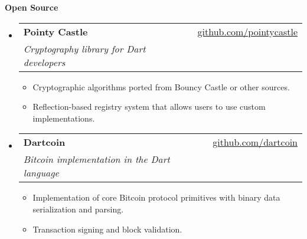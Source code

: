 \documentclass[letterpaper,11pt]{article}
\makeatletter
\newcommand{\resheading}[1]{{\large \colorbox{mygrey}{\begin{minipage}{\textwidth}{\textbf{#1 \vphantom{p\^{E}}}}\end{minipage}}}}
\newcommand{\ressubheading}[4]{
\begin{tabular*}{7.3in}{l@{\extracolsep{\fill}}r}
		\textbf{#1} & #2 \\
		\textit{#3} & \textit{#4} \\
\end{tabular*}\vspace{-6pt}}
\newcommand{\resitem}[1]{\item #1 \vspace{-2pt}}
\makeatother
\begin{document}
\resheading{Open Source}
\begin{itemize}[leftmargin=*]

\item[]
	\ressubheading{Pointy Castle}{\href{https://github.com/pointycastle}{github.com/pointycastle}}{Cryptography library for Dart developers}{ }
	\begin{itemize}
		\resitem{Cryptographic algorithms ported from Bouncy Castle or other sources.}
		\resitem{Reflection-based registry system that allows users to use custom implementations.}
	\end{itemize}

\item[]
	\ressubheading{Dartcoin}{\href{https://github.com/dartcoin}{github.com/dartcoin}}{Bitcoin implementation in the Dart language}{ }
	\begin{itemize}
		\resitem{Implementation of core Bitcoin protocol primitives with binary data serialization and parsing.}
		\resitem{Transaction signing and block validation.}
	\end{itemize}

\end{itemize}

\newpage
\end{document}
